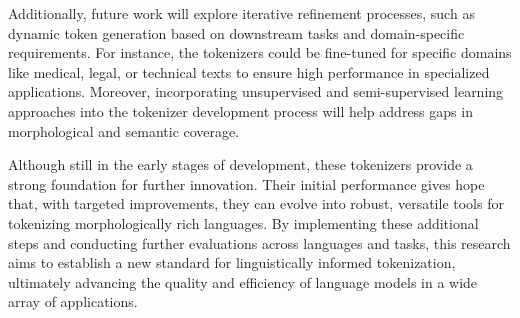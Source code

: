 Additionally, future work will explore iterative refinement processes, such as dynamic token generation based on downstream tasks and domain-specific requirements. For instance, the tokenizers could be fine-tuned for specific domains like medical, legal, or technical texts to ensure high performance in specialized applications. Moreover, incorporating unsupervised and semi-supervised learning approaches into the tokenizer development process will help address gaps in morphological and semantic coverage.

Although still in the early stages of development, these tokenizers provide a strong foundation for further innovation. Their initial performance gives hope that, with targeted improvements, they can evolve into robust, versatile tools for tokenizing morphologically rich languages. By implementing these additional steps and conducting further evaluations across languages and tasks, this research aims to establish a new standard for linguistically informed tokenization, ultimately advancing the quality and efficiency of language models in a wide array of applications.